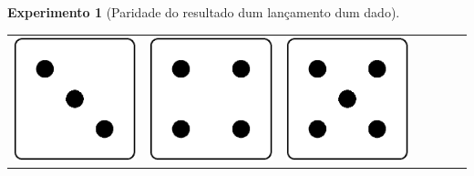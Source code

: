 \documentclass{beamer}
\theoremstyle{teoaxicorlem}
\theoremstyle{defnotnom}
\newtheorem{Expr}{Experimento}
\begin{document}
\begin{frame}
\begin{Expr}[Paridade do resultado dum lançamento dum dado]
\begin{tabular}{lcccccc}
      \includegraphics[width=.05\paperwidth]{dado3.eps} &
      \includegraphics[width=.05\paperwidth]{dado4.eps} &
      \includegraphics[width=.05\paperwidth]{dado5.eps} &

\end{tabular}
\end{Expr}
\end{frame}
\end{document}
